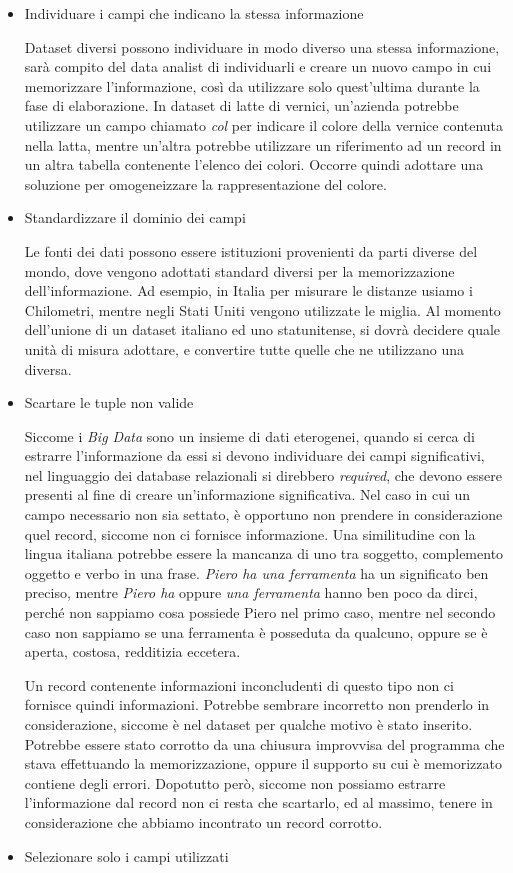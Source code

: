 \begin{itemize}
\item Individuare i campi che indicano la stessa informazione

Dataset diversi possono individuare in modo diverso una stessa informazione, sarà compito del data analist di individuarli e creare un nuovo campo in cui memorizzare l'informazione, così da utilizzare solo quest'ultima durante la fase di elaborazione. In dataset di latte di vernici, un'azienda potrebbe utilizzare un campo chiamato \emph{col} per indicare il colore della vernice contenuta nella latta, mentre un'altra potrebbe utilizzare un riferimento ad un record in un altra tabella contenente l'elenco dei colori. Occorre quindi adottare una soluzione per omogeneizzare la rappresentazione del colore.

\item Standardizzare il dominio dei campi

Le fonti dei dati possono essere istituzioni provenienti da parti diverse del mondo, dove vengono adottati standard diversi per la memorizzazione dell'informazione. Ad esempio, in Italia per misurare le distanze usiamo i Chilometri, mentre negli Stati Uniti vengono utilizzate le miglia. Al momento dell'unione di un dataset italiano ed uno statunitense, si dovrà decidere quale unità di misura adottare, e convertire tutte quelle che ne utilizzano una diversa.
\item Scartare le tuple non valide

Siccome i \emph{Big Data} sono un insieme di dati eterogenei, quando si cerca di estrarre l'informazione da essi si devono individuare dei campi significativi, nel linguaggio dei database relazionali si direbbero \emph{required}, che devono essere presenti al fine di creare un'informazione significativa. Nel caso in cui un campo necessario non sia settato, è opportuno non prendere in considerazione quel record, siccome non ci fornisce informazione. Una similitudine con la lingua italiana potrebbe essere la mancanza di uno tra soggetto, complemento oggetto e verbo in una frase. \emph{Piero ha una ferramenta} ha un significato ben preciso, mentre \emph{Piero ha} oppure \emph{una ferramenta} hanno ben poco da dirci, perché non sappiamo cosa possiede Piero nel primo caso, mentre nel secondo caso non sappiamo se una ferramenta è posseduta da qualcuno, oppure se è aperta, costosa, redditizia eccetera. 

Un record contenente informazioni inconcludenti di questo tipo non ci fornisce quindi informazioni. Potrebbe sembrare incorretto non prenderlo in considerazione, siccome è nel dataset per qualche motivo è stato inserito. Potrebbe essere stato corrotto da una chiusura improvvisa del programma che stava effettuando la memorizzazione, oppure il supporto su cui è memorizzato contiene degli errori. Dopotutto però, siccome non possiamo estrarre l'informazione dal record non ci resta che scartarlo, ed al massimo, tenere in considerazione che abbiamo incontrato un record corrotto.
\item Selezionare solo i campi utilizzati


\end{itemize}
